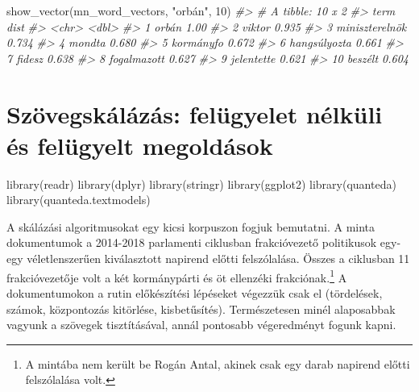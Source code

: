 \documentclass[
]{book}
\newenvironment{Shaded}{\begin{snugshade}}{\end{snugshade}}
\newcommand{\CommentTok}[1]{\textcolor[rgb]{0.56,0.35,0.01}{\textit{#1}}}
\newcommand{\DecValTok}[1]{\textcolor[rgb]{0.00,0.00,0.81}{#1}}
\newcommand{\FunctionTok}[1]{\textcolor[rgb]{0.00,0.00,0.00}{#1}}
\newcommand{\NormalTok}[1]{#1}
\newcommand{\StringTok}[1]{\textcolor[rgb]{0.31,0.60,0.02}{#1}}
\begin{document}
\begin{Shaded}
\begin{Highlighting}[]
\FunctionTok{show\_vector}\NormalTok{(mn\_word\_vectors, }\StringTok{"orbán"}\NormalTok{, }\DecValTok{10}\NormalTok{)}
\CommentTok{\#\textgreater{} \# A tibble: 10 x 2}
\CommentTok{\#\textgreater{}    term            dist}
\CommentTok{\#\textgreater{}    \textless{}chr\textgreater{}          \textless{}dbl\textgreater{}}
\CommentTok{\#\textgreater{}  1 orbán          1.00 }
\CommentTok{\#\textgreater{}  2 viktor         0.935}
\CommentTok{\#\textgreater{}  3 miniszterelnök 0.734}
\CommentTok{\#\textgreater{}  4 mondta         0.680}
\CommentTok{\#\textgreater{}  5 kormányfo      0.672}
\CommentTok{\#\textgreater{}  6 hangsúlyozta   0.661}
\CommentTok{\#\textgreater{}  7 fidesz         0.638}
\CommentTok{\#\textgreater{}  8 fogalmazott    0.627}
\CommentTok{\#\textgreater{}  9 jelentette     0.621}
\CommentTok{\#\textgreater{} 10 beszélt        0.604}
\end{Highlighting}
\end{Shaded}

\hypertarget{szuxf6vegskuxe1luxe1zuxe1s-feluxfcgyelet-nuxe9lkuxfcli-uxe9s-feluxfcgyelt-megolduxe1sok}{%
\chapter{Szövegskálázás: felügyelet nélküli és felügyelt
megoldások}\label{szuxf6vegskuxe1luxe1zuxe1s-feluxfcgyelet-nuxe9lkuxfcli-uxe9s-feluxfcgyelt-megolduxe1sok}}

\begin{Shaded}
\begin{Highlighting}[]
\FunctionTok{library}\NormalTok{(readr)}
\FunctionTok{library}\NormalTok{(dplyr)}
\FunctionTok{library}\NormalTok{(stringr)}
\FunctionTok{library}\NormalTok{(ggplot2)}
\FunctionTok{library}\NormalTok{(quanteda)}
\FunctionTok{library}\NormalTok{(quanteda.textmodels)}
\end{Highlighting}
\end{Shaded}

A skálázási algoritmusokat egy kicsi korpuszon fogjuk bemutatni. A minta
dokumentumok a 2014-2018 parlamenti ciklusban frakcióvezető politikusok
egy-egy véletlenszerűen kiválasztott napirend előtti felszólalása.
Összes a ciklusban 11 frakcióvezetője volt a két kormánypárti és öt
ellenzéki frakciónak.\footnote{A mintába nem került be Rogán Antal,
  akinek csak egy darab napirend előtti felszólalása volt.} A
dokumentumokon a rutin előkészítési lépéseket végezzük csak el
(tördelések, számok, központozás kitörlése, kisbetűsítés). Természetesen
minél alaposabbak vagyunk a szövegek tisztításával, annál pontosabb
végeredményt fogunk kapni.
\end{document}
